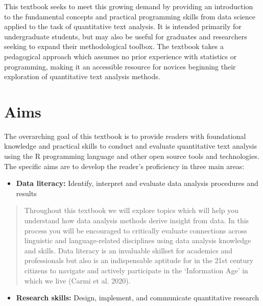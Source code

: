 \documentclass[
  letterpaper,
]{latex/krantz}
\providecommand{\tightlist}{%
  \setlength{\itemsep}{0pt}\setlength{\parskip}{0pt}}\usepackage{longtable,booktabs,array}
\begin{document}
This textbook seeks to meet this growing demand by providing an
introduction to the fundamental concepts and practical programming
skills from data science applied to the task of quantitative text
analysis. It is intended primarily for undergraduate students, but may
also be useful for graduates and researchers seeking to expand their
methodological toolbox. The textbook takes a pedagogical approach which
assumes no prior experience with statistics or programming, making it an
accessible resource for novices beginning their exploration of
quantitative text analysis methods.

\hypertarget{aims}{%
\section*{Aims}\label{aims}}


The overarching goal of this textbook is to provide readers with
foundational knowledge and practical skills to conduct and evaluate
quantitative text analysis using the R programming language and other
open source tools and technologies. The specific aims are to develop the
reader's proficiency in three main areas:

\begin{itemize}
\tightlist
\item
  \textbf{Data literacy:} Identify, interpret and evaluate data analysis
  procedures and results
\end{itemize}

\begin{quote}
Throughout this textbook we will explore topics which will help you
understand how data analysis methods derive insight from data. In this
process you will be encouraged to critically evaluate connections across
linguistic and language-related disciplines using data analysis
knowledge and skills. Data literacy is an invaluable skillset for
academics and professionals but also is an indispensable aptitude for in
the 21st century citizens to navigate and actively participate in the
`Information Age' in which we live (Carmi et al. 2020).
\end{quote}

\begin{itemize}
\tightlist
\item
  \textbf{Research skills:} Design, implement, and communicate
  quantitative research
\end{itemize}
\end{document}
